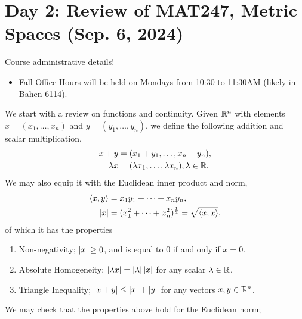 \section{Day 2: Review of MAT247, Metric Spaces (Sep. 6, 2024)}
Course administrative details!
\begin{itemize}
    \item Fall Office Hours will be held on Mondays from 10:30 to 11:30AM (likely in Bahen 6114).
\end{itemize}
We start with a review on functions and continuity. Given $\mathbb R^n$ with elements $x = (x_1, \dots, x_n)$ and $y = (y_1, \dots, y_n)$, we define the following addition and scalar multiplication,
\begin{align*}
    x + y &= (x_1 + y_1, \dots, x_n + y_n), \\
    \lambda x &= (\lambda x_1, \dots, \lambda x_n), \lambda \in \mathbb R.
\end{align*}
We may also equip it with the Euclidean inner product and norm,
\begin{align*}
    \left< x, y \right> &= x_1y_1 + \dots + x_ny_n, \\
    \left\lvert x \right\rvert &= (x_1^2 + \dots + x_n^2)^{\frac{1}{2}} = \sqrt{\left<x, x\right>},
\end{align*}
of which it has the properties
\begin{enumerate}[label=(\alph*)]
    \item Non-negativity; $\left\lvert x \right\rvert \geq 0$, and is equal to $0$ if and only if $x = 0$.
    \item Absolute Homogeneity; $\left\lvert \lambda x \right\rvert = \left\lvert \lambda \right\rvert \left\lvert x \right\rvert$ for any scalar $\lambda \in \mathbb R$.
    \item Triangle Inequality; $\left\lvert x + y \right\rvert \leq \left\lvert x \right\rvert + \left\lvert y \right\rvert$ for any vectors $x, y \in \mathbb R^n$.
\end{enumerate}
We may check that the properties above hold for the Euclidean norm;
